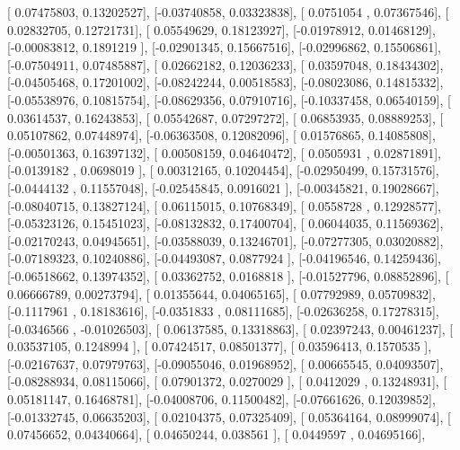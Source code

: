 \documentclass{article}
\begin{document}
       [ 0.07475803,  0.13202527],
       [-0.03740858,  0.03323838],
       [ 0.0751054 ,  0.07367546],
       [ 0.02832705,  0.12721731],
       [ 0.05549629,  0.18123927],
       [-0.01978912,  0.01468129],
       [-0.00083812,  0.1891219 ],
       [-0.02901345,  0.15667516],
       [-0.02996862,  0.15506861],
       [-0.07504911,  0.07485887],
       [ 0.02662182,  0.12036233],
       [ 0.03597048,  0.18434302],
       [-0.04505468,  0.17201002],
       [-0.08242244,  0.00518583],
       [-0.08023086,  0.14815332],
       [-0.05538976,  0.10815754],
       [-0.08629356,  0.07910716],
       [-0.10337458,  0.06540159],
       [ 0.03614537,  0.16243853],
       [ 0.05542687,  0.07297272],
       [ 0.06853935,  0.08889253],
       [ 0.05107862,  0.07448974],
       [-0.06363508,  0.12082096],
       [ 0.01576865,  0.14085808],
       [-0.00501363,  0.16397132],
       [ 0.00508159,  0.04640472],
       [ 0.0505931 ,  0.02871891],
       [-0.0139182 ,  0.0698019 ],
       [ 0.00312165,  0.10204454],
       [-0.02950499,  0.15731576],
       [-0.0444132 ,  0.11557048],
       [-0.02545845,  0.0916021 ],
       [-0.00345821,  0.19028667],
       [-0.08040715,  0.13827124],
       [ 0.06115015,  0.10768349],
       [ 0.0558728 ,  0.12928577],
       [-0.05323126,  0.15451023],
       [-0.08132832,  0.17400704],
       [ 0.06044035,  0.11569362],
       [-0.02170243,  0.04945651],
       [-0.03588039,  0.13246701],
       [-0.07277305,  0.03020882],
       [-0.07189323,  0.10240886],
       [-0.04493087,  0.0877924 ],
       [-0.04196546,  0.14259436],
       [-0.06518662,  0.13974352],
       [ 0.03362752,  0.0168818 ],
       [-0.01527796,  0.08852896],
       [ 0.06666789,  0.00273794],
       [ 0.01355644,  0.04065165],
       [ 0.07792989,  0.05709832],
       [-0.1117961 ,  0.18183616],
       [-0.0351833 ,  0.08111685],
       [-0.02636258,  0.17278315],
       [-0.0346566 , -0.01026503],
       [ 0.06137585,  0.13318863],
       [ 0.02397243,  0.00461237],
       [ 0.03537105,  0.1248994 ],
       [ 0.07424517,  0.08501377],
       [ 0.03596413,  0.1570535 ],
       [-0.02167637,  0.07979763],
       [-0.09055046,  0.01968952],
       [ 0.00665545,  0.04093507],
       [-0.08288934,  0.08115066],
       [ 0.07901372,  0.0270029 ],
       [ 0.0412029 ,  0.13248931],
       [ 0.05181147,  0.16468781],
       [-0.04008706,  0.11500482],
       [-0.07661626,  0.12039852],
       [-0.01332745,  0.06635203],
       [ 0.02104375,  0.07325409],
       [ 0.05364164,  0.08999074],
       [ 0.07456652,  0.04340664],
       [ 0.04650244,  0.038561  ],
       [ 0.0449597 ,  0.04695166],
\end{document}
